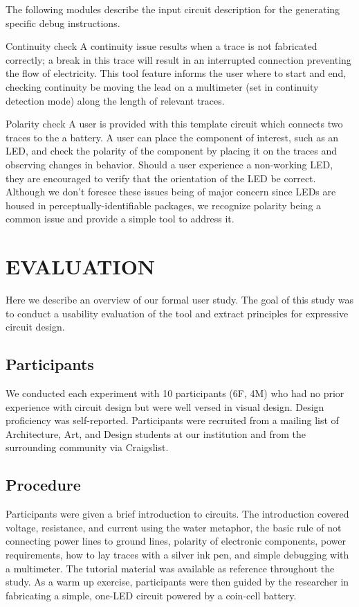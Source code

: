 \documentclass{sigchi}
\begin{document}
        The following modules describe the input circuit description for the generating specific debug instructions.

        Continuity check
        A continuity issue results when a trace is not fabricated correctly; a break in this trace will result in an interrupted connection preventing the flow of electricity. This tool feature informs the user where to start and end, checking continuity be moving the lead on a multimeter (set in continuity detection mode) along the length of relevant traces.

        Polarity check
        A user is provided with this template circuit which connects two traces to the a battery. A user can place the component of interest, such as an LED, and check the polarity of the component by placing it on the traces and observing changes in behavior. Should a user experience a non-working LED, they are encouraged to verify that the orientation of the LED be correct. Although we don't foresee these issues being of major concern since LEDs are housed in perceptually-identifiable packages, we recognize polarity being a common issue and provide a simple tool to address it.




\section{EVALUATION}
    Here we describe an overview of our formal user study. The goal of this study was to conduct a usability evaluation of the tool and extract principles for expressive circuit design.

\subsection{Participants}
    We conducted each experiment with 10 participants (6F, 4M) who had no prior experience with circuit design but were well versed in visual design. Design proficiency was self-reported. Participants were recruited from a mailing list of Architecture, Art, and Design students at our institution and from the surrounding community via Craigslist.

\subsection{Procedure}
    Participants were given a brief introduction to circuits. The introduction covered voltage, resistance, and current using the water metaphor, the basic rule of not connecting power lines to ground lines, polarity of electronic components, power requirements, how to lay traces with a silver ink pen, and simple debugging with a multimeter. The tutorial material was available as reference throughout the study. As a warm up exercise, participants were then guided by the researcher in fabricating a simple, one-LED circuit powered by a coin-cell battery.
\end{document}
